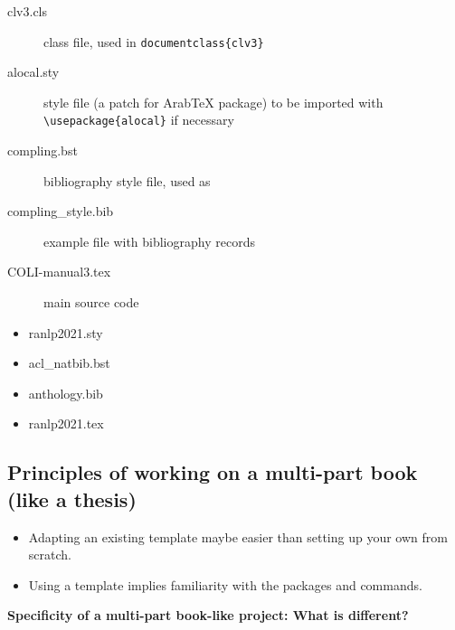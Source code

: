\documentclass[a4paper,11pt]{article}
\newcounter{example}
\begin{document}
\begin{minipage}[c]{0.65\linewidth}
	\begin{tcolorbox}[title={Computational Linguistics by MIT Press Journals}]
		\begin{description}
			\item[clv3.cls] class file, used in \verb|documentclass{clv3}|
			\item[alocal.sty] style file (a patch for ArabTeX package) to be imported with \verb|\usepackage{alocal}| if necessary
			\item[compling.bst] bibliography style file, used as \verb||
			\item[compling\_style.bib] example file with bibliography records 
			\item[COLI-manual3.tex] main source code 
		\end{description}
	\end{tcolorbox}
\end{minipage} 
\hfill  %
\begin{minipage}[c]{0.3\linewidth}
	\begin{tcolorbox}[title={RANLP conference}]
		\begin{itemize}
			\item ranlp2021.sty
			\item acl\_natbib.bst
			\item anthology.bib
			\item ranlp2021.tex
		\end{itemize}
	\end{tcolorbox}
\end{minipage}

\subsection{Principles of working on a multi-part book (like a thesis)}

\begin{itemize}
	\item Adapting an existing template maybe easier than setting up your own from scratch.
	\item Using a template implies familiarity with the packages and commands.
\end{itemize}

\textbf{Specificity of a multi-part book-like project: What is different?}
\end{document}
